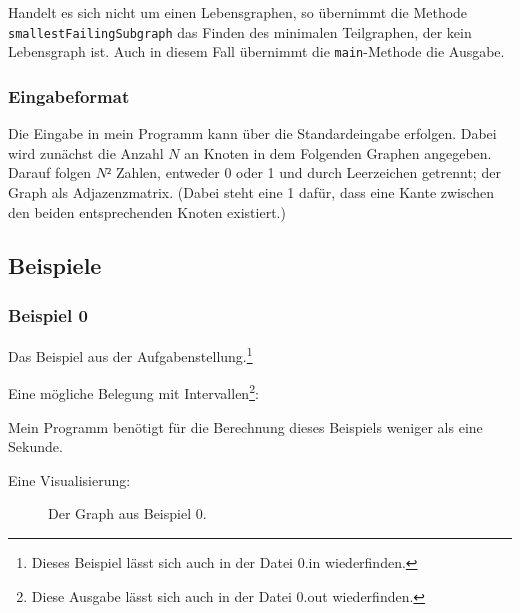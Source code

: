 Handelt es sich nicht um einen Lebensgraphen, so übernimmt die Methode \texttt{smallestFailingSubgraph} das Finden des minimalen Teilgraphen, der kein Lebensgraph ist. Auch in diesem Fall übernimmt die \texttt{main}-Methode die Ausgabe.

\subsubsection{Eingabeformat}

Die Eingabe in mein Programm kann über die Standardeingabe erfolgen. Dabei wird zunächst die Anzahl $N$ an Knoten in dem Folgenden Graphen angegeben. Darauf folgen $N²$ Zahlen, entweder 0 oder 1 und durch Leerzeichen getrennt; der Graph als Adjazenzmatrix. (Dabei steht eine 1 dafür, dass eine Kante zwischen den beiden entsprechenden Knoten existiert.)
 
\subsection{Beispiele}
\subsubsection*{Beispiel 0}
Das Beispiel aus der Aufgabenstellung.\footnote{Dieses Beispiel lässt sich auch in der Datei 0.in wiederfinden.}

{\small

}

Eine mögliche Belegung mit Intervallen\footnote{Diese Ausgabe lässt sich auch in der Datei 0.out wiederfinden.}:

{\small

}

Mein Programm benötigt für die Berechnung dieses Beispiels weniger als eine Sekunde.

Eine Visualisierung:

\begin{center}
\begin{figure}[h]
\caption{Der Graph aus Beispiel 0.}
\end{figure}
\end{center}


